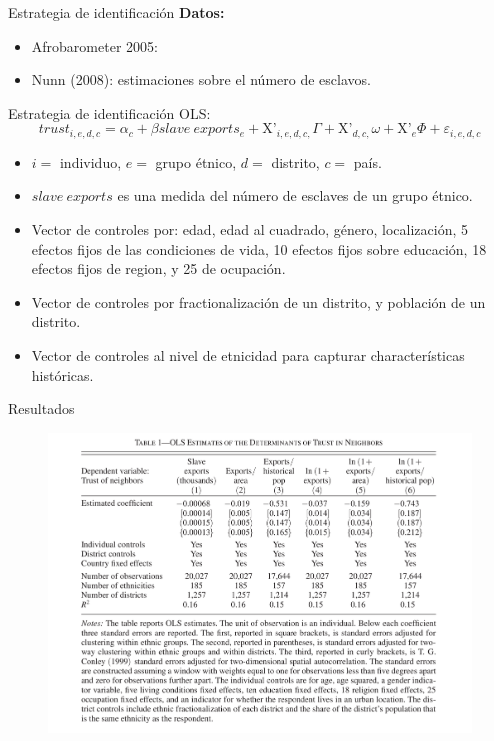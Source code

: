 \documentclass[11pt, aspectratio=169, compress]{beamer}
\begin{document}
\begin{frame}{Estrategia de identificación}
\textbf{Datos: }
\begin{itemize}
	\item Afrobarometer 2005: 
	\item Nunn (2008): estimaciones sobre el número de esclavos. 
\end{itemize}
\end{frame}
\begin{frame}{Estrategia de identificación}
OLS: 
\begin{equation}
	trust_{i,e,d,c} = \alpha_c + \beta slave~exports_e + \mathrm{\text{X'}}_{i,e,d,c,}\Gamma + \mathrm{\text{X'}}_{d,c,}\omega + \mathrm{\text{X'}}_{e}\Phi + \varepsilon_{i,e,d,c}
\end{equation}

\begin{itemize}\small
	\item $ i = $ individuo, $ e = $ grupo étnico, $ d = $ distrito, $ c = $ país. 
	\item $ slave~exports $ es una medida del número de esclaves de un grupo étnico. 
	\item Vector de controles por: edad, edad al cuadrado, género, localización, 5 efectos fijos de las condiciones de vida, 10 efectos fijos sobre educación, 18 efectos fijos de region, y 25 de ocupación. 
	\item Vector de controles por fractionalización de un distrito, y población de un distrito. 
	\item Vector de controles al nivel de etnicidad para capturar characterísticas históricas. 
\end{itemize}
\end{frame}
\begin{frame}{Resultados}
\begin{figure}[htb]
	\centering
	\includegraphics[width=.7\textwidth]{tab1}
\end{figure}
\end{frame}
\end{document}
